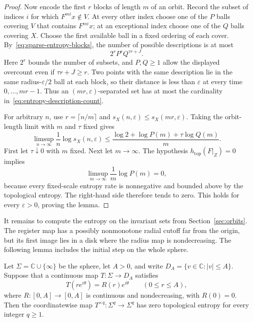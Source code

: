 \begin{proof}
Now encode the first $r$ blocks of length $m$ of an orbit.  Record
the subset of indices $i$ for which $F^{mi}x\notin V$.  At every other
index choose one of the $P$ balls covering $V$ that contains
$F^{mi}x$; at an exceptional index choose one of the $Q$ balls
covering $X$.  Choose the first available ball in a fixed ordering
of each cover.  By~\eqref{eq:sparse-entropy-blocks}, the number of
possible descriptions is at most
\begin{equation}\label{eq:entropy-description-count}
  2^r P^r Q^{\tau r+J}.
\end{equation}
Here $2^r$ bounds the number of subsets, and $P,Q\geq1$ allow the
displayed overcount even if $\tau r+J\geq r$.  Two points with the
same description lie in the same radius-$\varepsilon/2$ ball at each
block, so their distance is less than $\varepsilon$ at every time
$0,\ldots,mr-1$.  Thus an $(mr,\varepsilon)$-separated set has at most
the cardinality in~\eqref{eq:entropy-description-count}.

For arbitrary $n$, use $r=\lceil n/m\rceil$ and
$s_X(n,\varepsilon)\leq s_X(mr,\varepsilon)$.  Taking the orbit-length
limit with $m$ and $\tau$ fixed gives
\[
  \limsup_{n\to\infty}\frac{1}{n}\log s_X(n,\varepsilon)
  \leq \frac{\log 2+\log P(m)+\tau\log Q(m)}{m}.
\]
First let $\tau\downarrow0$ with $m$ fixed.  Next let $m\to\infty$.
The hypothesis $h_{\mathrm{top}}(F|_Z)=0$ implies
\[
  \limsup_{m\to\infty}\frac{1}{m}\log P(m)=0,
\]
because every fixed-scale entropy rate is nonnegative and bounded
above by the topological entropy.  The right-hand side therefore
tends to zero.  This holds for every $\varepsilon>0$, proving the lemma.
\end{proof}

It remains to compute the entropy on the invariant sets from
Section~\ref{sec:orbits}.  The register map has a possibly
nonmonotone radial cutoff far from the origin, but its first image
lies in a disk where the radius map is nondecreasing.  The following
lemma includes the initial step on the whole sphere.

\begin{lemma}\label{lemma:register-entropy}
Let $\Sigma=\mathbb C\cup\{\infty\}$ be the sphere, let $A>0$, and
write $D_A=\{v\in\mathbb C:|v|\leq A\}$.  Suppose that a continuous
map $T:\Sigma\to D_A$ satisfies
\[
  T(re^{i\theta})=R(r)e^{i\theta}
  \qquad(0\leq r\leq A),
\]
where $R:[0,A]\to[0,A]$ is continuous and nondecreasing, with
$R(0)=0$.  Then the coordinatewise map
$T^{\times q}:\Sigma^q\to\Sigma^q$ has zero topological entropy
for every integer $q\geq1$.
\end{lemma}

